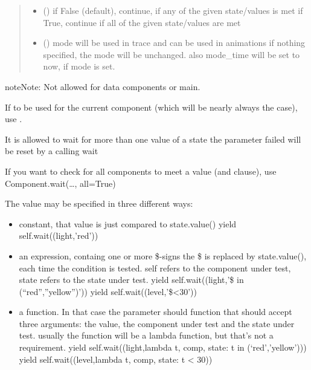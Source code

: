 \documentclass[letterpaper,10pt,english]{sphinxmanual}
\begin{document}
\begin{fulllineitems}
\begin{fulllineitems}
\begin{quote}
\begin{description}
\begin{itemize}
\item {} 
 () \textendash{} if False (default), continue, if any of the given state/values is met 
if True, continue if all of the given state/values are met

\item {} 
 () \textendash{} mode 
will be used in trace and can be used in animations 
if nothing specified, the mode will be unchanged. 
also mode\_time will be set to now, if mode is set.

\end{itemize}

\end{description}\end{quote}

\begin{sphinxadmonition}{note}{Note:}
Not allowed for data components or main.

If to be used for the current component
(which will be nearly always the case),
use .

It is allowed to wait for more than one value of a state 
the parameter failed will be reset by a calling wait

If you want to check for all components to meet a value (and clause),
use Component.wait(…, all=True)

The value may be specified in three different ways:
\begin{itemize}
\item {} 
constant, that value is just compared to state.value() 
yield self.wait((light,’red’))

\item {} 
an expression, containg one or more \$-signs
the \$ is replaced by state.value(), each time the condition is tested. 
self refers to the component under test, state refers to the state
under test. 
yield self.wait((light,’\$ in (“red”,”yellow”)’)) 
yield self.wait((level,’\$\textless{}30’)) 

\item {} 
a function. In that case the parameter should function that
should accept three arguments: the value, the component under test and the
state under test. 
usually the function will be a lambda function, but that’s not
a requirement. 
yield self.wait((light,lambda t, comp, state: t in (‘red’,’yellow’))) 
yield self.wait((level,lambda t, comp, state: t \textless{} 30)) 


\end{itemize}
\end{sphinxadmonition}
\end{fulllineitems}
\end{fulllineitems}
\end{document}
